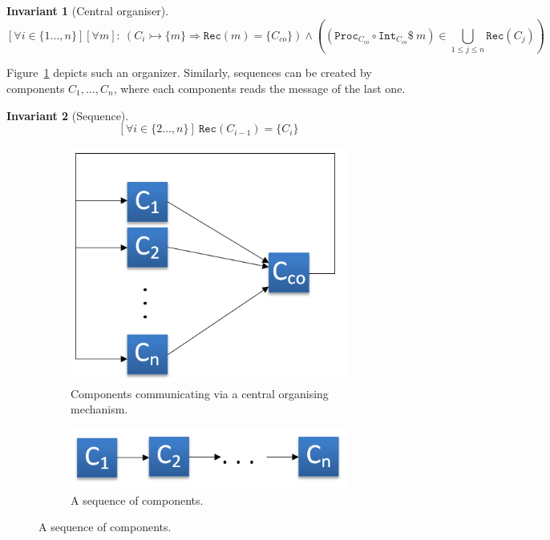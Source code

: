 \documentclass[]{scrartcl}
\newtheorem{invariant}{Invariant}
\renewcommand{\tt}[1]{\texttt{#1}}
\newcommand{\cansend}[2]{#1 \rightarrowtail \{#2\}}
\newcommand{\rec}[1]{\tt{Rec}(#1)}
\renewcommand{\int}[1]{\tt{Int}_{#1}}
\newcommand{\proc}[1]{\tt{Proc}_{#1}}
\begin{document}
\begin{invariant}[Central organiser]
$$
	 [\forall i \in \{1\dots,n\}] [\forall m]:\ \left(\cansend{C_i}{m} \Rightarrow \rec{m} = \{C_{co}\}\right) \wedge \left( \left( \proc{C_{co}} \circ \int{C_{co}} \$\ m  \right) \in \bigcup\limits_{1 \leq j \leq n} \rec{C_j} \right)
$$
\end{invariant}

Figure~\ref{fig:centralOrganizer} depicts such an organizer. Similarly, sequences can be created by components $C_{1},\dots,C_{n}$, where each components reads the message of the last one.

\begin{invariant}[Sequence]
$$
	[\forall i \in \{2\dots,n\}]\ \rec{C_{i-1}} = \{C_i\}
$$
\end{invariant}

\begin{figure}
	\centering
	\begin{subfigure}[t]{0.45\textwidth}
		\includegraphics[width=\textwidth]{figs/c_co.png}
		\caption{Components communicating via a central organising mechanism.}
		\label{fig:centralOrganizer}
	\end{subfigure}
	\begin{subfigure}[t]{0.45\textwidth}
		\includegraphics[width=\textwidth]{figs/c_sequence.png}
		\caption{A sequence of components.}
		\label{fig:c_sequence}
	\end{subfigure}
\end{figure}
\end{document}

